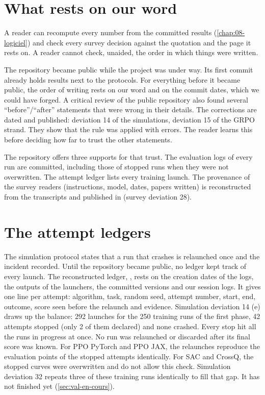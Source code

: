 \section{What rests on our word}
\label{sec:parole}

A reader can recompute every number from the committed results (\cref{chap:08-logiciel}) and check
every survey decision against the quotation and the page it rests on. A reader cannot check, unaided,
the order in which things were written.

The repository became public while the project was under way. Its first commit
already holds results next to the protocols. For everything before it became public, the order of writing
rests on our word and on the commit dates, which we could have forged. A critical review of
the public repository also found several \enquote{before}/\enquote{after} statements that were wrong
in their details. The corrections are dated and published: deviation 14 of the simulations,
deviation 15 of the GRPO strand. They show that the rule was applied with errors. The reader learns
this before deciding how far to trust the other statements.

The repository offers three supports for that trust. The evaluation logs of every run are committed,
including those of stopped runs when they were not overwritten. The attempt ledger lists every
training launch. The provenance of the survey readers (instructions, model, dates, papers written)
is reconstructed from the transcripts and published in  (survey deviation 28).

\section{The attempt ledgers}
\label{sec:registres}

The simulation protocol states that a run that crashes is relaunched once and the incident recorded.
Until the repository became public, no ledger kept track of every launch. The reconstructed ledger,
, rests on the creation dates of the logs, the outputs of
the launchers, the committed versions and our session logs. It gives one line per attempt:
algorithm, task, random seed, attempt number, start, end, outcome, score seen before the relaunch and
evidence. Simulation deviation 14 (e) draws up the balance: 292 launches for the 250 training runs of
the first phase, 42 attempts stopped (only 2 of them declared) and none crashed. Every stop hit all
the runs in progress at once. No run was relaunched or discarded after its final score was known. For
PPO PyTorch and PPO JAX, the relaunches reproduce the evaluation points of the stopped attempts
identically. For SAC and CrossQ, the stopped curves were overwritten and do not allow this check.
Simulation deviation 32 repeats three of these training runs identically to fill that gap. It has
not finished yet (\cref{sec:val-en-cours}).

